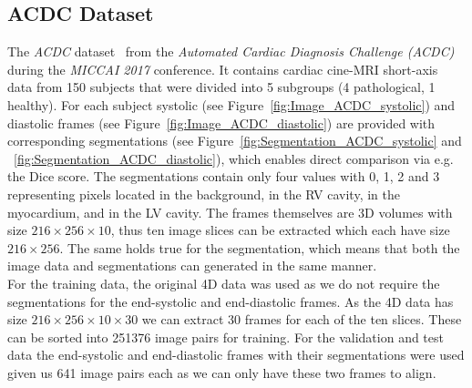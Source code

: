 \documentclass[english,version-2022-01]{uzl-thesis} %
\begin{document}
\subsection{ACDC Dataset} \label{SubSec:ACDC}
The \emph{ACDC} dataset~\cite{ACDC} from the \emph{Automated Cardiac Diagnosis Challenge (ACDC)} during the \emph{MICCAI 2017} conference. It contains cardiac cine-MRI short-axis data from 150 subjects that were divided into 5 subgroups (4 pathological, 1 healthy). For each subject systolic (see Figure~\ref{fig:Image_ACDC_systolic}) and diastolic frames (see Figure~\ref{fig:Image_ACDC_diastolic}) are provided with corresponding segmentations (see Figure~\ref{fig:Segmentation_ACDC_systolic} and ~\ref{fig:Segmentation_ACDC_diastolic}), which enables direct comparison via e.g. the Dice score. The segmentations contain only four values with 0, 1, 2 and 3 representing pixels located in the background, in the RV cavity, in the myocardium, and in the LV cavity. The frames themselves are 3D volumes with size $216 \times 256 \times 10$, thus ten image slices can be extracted which each have size $216 \times 256$. The same holds true for the segmentation, which means that both the image data and segmentations can generated in the same manner.\\
For the training data, the original 4D data was used as we do not require the segmentations for the end-systolic and end-diastolic frames. As the 4D data has size $216 \times 256 \times 10 \times 30$ we can extract 30 frames for each of the ten slices. These can be sorted into 251376 image pairs for training. For the validation and test data the end-systolic and end-diastolic frames with their segmentations were used given us 641 image pairs each as we can only have these two frames to align.
\end{document}
